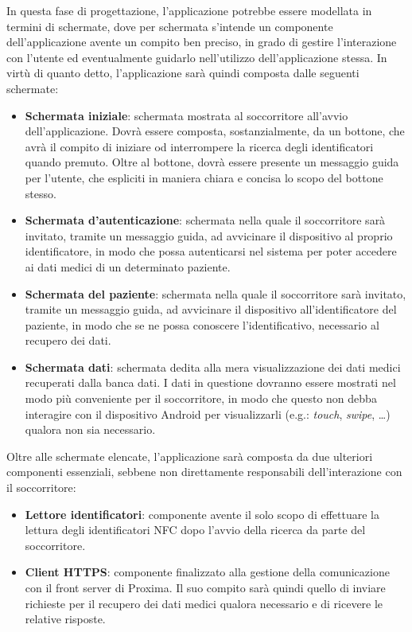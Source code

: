 \documentclass[a4paper,12pt]{report}
\begin{document}
In questa fase di progettazione, l'applicazione potrebbe essere modellata in termini di schermate, dove per schermata s'intende un componente dell'applicazione avente un compito ben preciso, in grado di gestire l'interazione con l'utente ed eventualmente guidarlo nell'utilizzo dell'applicazione stessa. In virtù di quanto detto, l'applicazione sarà quindi composta dalle seguenti schermate:
\begin{itemize}
	\item \textbf{Schermata iniziale}: schermata mostrata al soccorritore all'avvio dell'applicazione. Dovrà essere composta, sostanzialmente, da un bottone, che avrà il compito di iniziare od interrompere la ricerca degli identificatori quando premuto. Oltre al bottone, dovrà essere presente un messaggio guida per l'utente, che espliciti in maniera chiara e concisa lo scopo del bottone stesso.
	\item \textbf{Schermata d'autenticazione}: schermata nella quale il soccorritore sarà invitato, tramite un messaggio guida, ad avvicinare il dispositivo al proprio identificatore, in modo che possa autenticarsi nel sistema per poter accedere ai dati medici di un determinato paziente.
	\item \textbf{Schermata del paziente}: schermata nella quale il soccorritore sarà invitato, tramite un messaggio guida, ad avvicinare il dispositivo all'identificatore del paziente, in modo che se ne possa conoscere l'identificativo, necessario al recupero dei dati.
	\item \textbf{Schermata dati}: schermata dedita alla mera visualizzazione dei dati medici recuperati dalla banca dati. I dati in questione dovranno essere mostrati nel modo più conveniente per il soccorritore, in modo che questo non debba interagire con il dispositivo Android per visualizzarli (e.g.: \emph{touch}, \emph{swipe}, \dots) qualora non sia necessario.   
\end{itemize}

Oltre alle schermate elencate, l'applicazione sarà composta da due ulteriori componenti essenziali, sebbene non direttamente responsabili dell'interazione con il soccorritore:
\begin{itemize}
	\item \textbf{Lettore identificatori}: componente avente il solo scopo di effettuare la lettura degli identificatori NFC dopo l'avvio della ricerca da parte del soccorritore.
	\item \textbf{Client HTTPS}: componente finalizzato alla gestione della comunicazione con il front server di Proxima. Il suo compito sarà quindi quello di inviare richieste per il recupero dei dati medici qualora necessario e di ricevere le relative risposte.  
\end{itemize}
\end{document}
